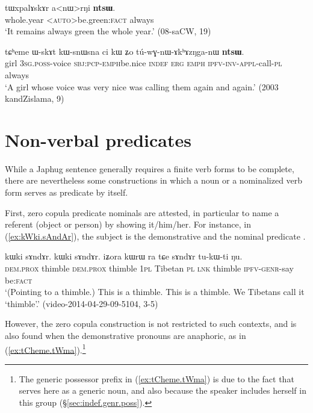 \begin{exe}
\ex \label{ex:anWrNi.ntsW}
\gll tɯxpalɤskɤr a<nɯ>rŋi \textbf{ntsɯ}. \\
whole.year <\textsc{auto}>be.green:\textsc{fact} always \\
\glt `It remains always green the whole year.' (08-saCW, 19)
\end{exe}

\begin{exe}
\ex \label{ex:postV.ntsW}
\gll  tɕʰeme ɯ-skɤt kɯ-snɯ\redp{}sna ci kɯ ʑo tú-wɣ-nɯ-ɤkʰɤzŋga-nɯ \textbf{ntsɯ}. \\
girl \textsc{3sg}.\textsc{poss}-voice \textsc{sbj}:\textsc{pcp}-\textsc{emph}\redp{}be.nice \textsc{indef} \textsc{erg} \textsc{emph} \textsc{ipfv}-\textsc{inv}-\textsc{appl}-call-\textsc{pl} always \\
\glt `A girl whose voice was very nice was calling them again and again.' (2003 kandZislama, 9)
\end{exe}

 
\section{Non-verbal predicates} \label{sec:non.verbal.predicates}
While a Japhug sentence generally requires a finite verb forms to be complete, there are nevertheless some constructions in which a noun or a nominalized verb form serves as predicate by itself.

First, zero copula predicate nominals are attested, in particular to name a referent (object or person) by showing it/him/her. For instance, in (\ref{ex:kWki.sAndAr}), the subject is the demonstrative  and the nominal predicate . 
 
\begin{exe}
\ex \label{ex:kWki.sAndAr}
\gll kɯki sɤndɤr. kɯki sɤndɤr. iʑora kɯrɯ ra tɕe sɤndɤr tu-kɯ-ti ŋu. \\
\textsc{dem}.\textsc{prox} thimble  \textsc{dem}.\textsc{prox} thimble \textsc{1pl} Tibetan \textsc{pl} \textsc{lnk} thimble \textsc{ipfv}-\textsc{genr}-say be:\textsc{fact} \\
\glt `(Pointing to a thimble.) This is a thimble. This is a thimble. We Tibetans call it `thimble'.' (video-2014-04-29-09-5104, 3-5)
\end{exe}

However, the zero copula construction is not restricted to such contexts, and is also found when the demonstrative pronouns are anaphoric, as in (\ref{ex:tCheme.tWma}).\footnote{The generic possessor prefix in (\ref{ex:tCheme.tWma}) is due to the fact that  serves here as a generic noun, and also because the speaker includes herself in this group (§\ref{sec:indef.genr.poss}). }

